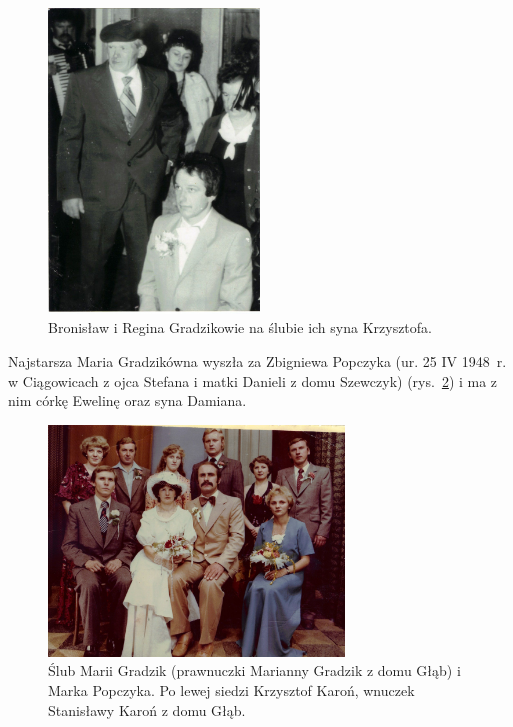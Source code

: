\begin{figure}[!h]
\begin{center}
\includegraphics[width=0.5\textwidth]{zdjecia/bronislaw_regina_krzysztof_gradzikowie.jpg}
\caption{Bronisław i Regina Gradzikowie na ślubie ich syna Krzysztofa.}
\label{rys:bronislaw_regina_krzysztof_gradzikowie}
\end{center}
\end{figure}

Najstarsza Maria Gradzikówna wyszła za Zbigniewa Popczyka (ur. 25 IV 1948~r. w Ciągowicach z ojca Stefana i matki Danieli z domu Szewczyk) (rys.~\ref{rys:slub_marii_gradzik_i_marka_popczyka}) i ma z nim córkę Ewelinę oraz syna Damiana.

\begin{figure}[!h]
\begin{center}
\includegraphics[width=0.7\textwidth]{zdjecia/slub_marii_gradzik_i_marka_popczyka.jpg}
\caption[Ślub Marii Gradzik i Marka Popczyka]{Ślub Marii Gradzik (prawnuczki Marianny Gradzik z domu Głąb) i Marka Popczyka. Po lewej siedzi Krzysztof Karoń, wnuczek Stanisławy Karoń z domu Głąb.}
\label{rys:slub_marii_gradzik_i_marka_popczyka}
\end{center}
\end{figure}

